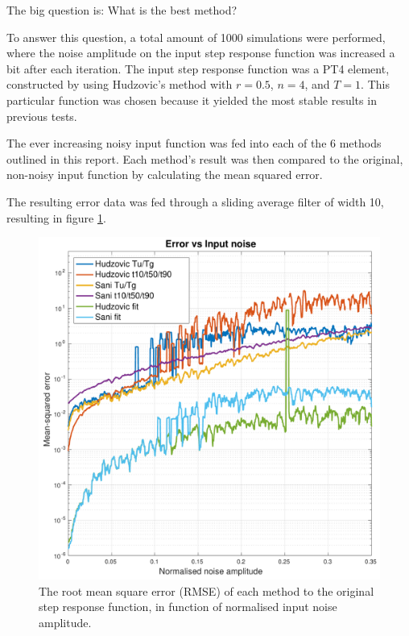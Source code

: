 The big question is: What is the best method?

To answer this question, a  total  amount  of  1000  simulations were performed,
where the noise amplitude  on  the  input step response function was increased a
bit after each iteration. The input step response  function  was  a PT4 element,
constructed  by using Hudzovic's method with $r=0.5$,  $n=4$,  and  $T=1$.  This
particular function was chosen because it yielded the  most  stable  results  in
previous tests.

The ever  increasing  noisy  input  function  was fed into each of the 6 methods
outlined in this report. Each method's result was then compared to the original,
non-noisy input function by calculating the mean squared error.

The resulting error data was fed through a sliding average filter of  width  10,
resulting in figure \ref{fig:error_noise}.

\begin{figure}
    \includegraphics[width=\linewidth]{images/error_noise}
    \caption{The root mean square error (RMSE) of each method to the original step response function, in function of normalised input noise amplitude.}
    \label{fig:error_noise}
\end{figure}

